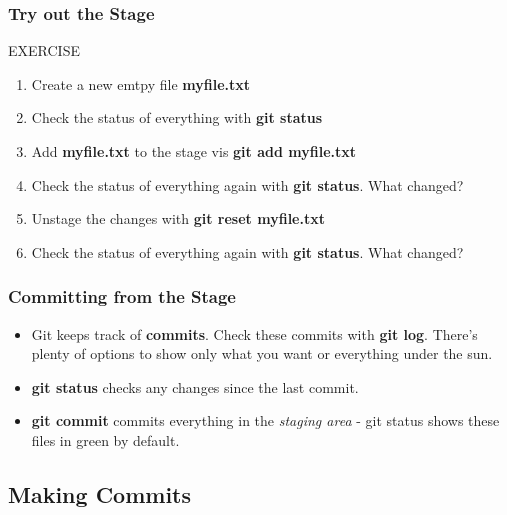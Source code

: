 \documentclass{beamer}
\begin{document}
\begin{frame}[fragile]
\frametitle{Try out the Stage}
	\begin{block}{EXERCISE}
		\begin{enumerate}
		\item Create a new emtpy file \textbf{myfile.txt}
		\item Check the status of everything with \textbf{git status}
		\item Add \textbf{myfile.txt} to the stage vis \textbf{git add myfile.txt}
		\item Check the status of everything again with \textbf{git status}. What changed?
		\item Unstage the changes with \textbf{git reset myfile.txt}
		\item Check the status of everything again with \textbf{git status}. What changed?
		\end{enumerate}
	\end{block}

\end{frame}


\begin{frame}[fragile]
\frametitle{Committing from the Stage}
\begin{itemize}
\item Git keeps track of \textbf{commits}. Check these commits with \textbf{git log}. There's plenty of options to show only what you want or everything under the sun. 
\item \textbf{git status} checks any changes since the last commit.
\item \textbf{git commit} commits everything in the \textit{staging area} - git status shows these files in {\color{dkgreen}green} by default.
\end{itemize}
\end{frame}

\subsection{Making Commits}
\end{document}

